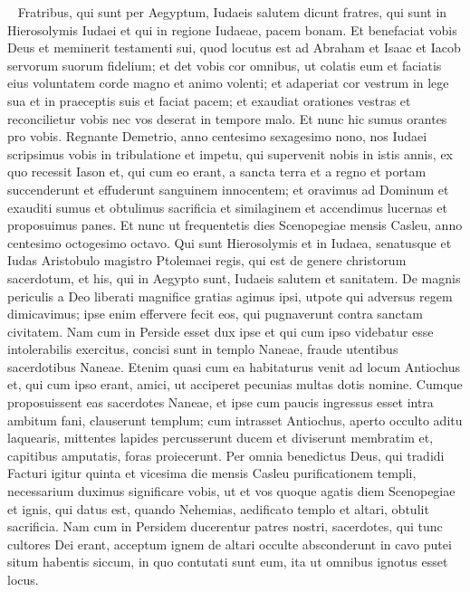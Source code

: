 
\begin{biblechapter}   
\verse Fratribus, qui sunt per Aegyptum, Iudaeis salutem dicunt fratres, qui sunt in Hierosolymis Iudaei et qui in regione Iudaeae, pacem bonam.  
\verse Et benefaciat vobis Deus et meminerit testamenti sui, quod locutus est ad Abraham et Isaac et Iacob servorum suorum fidelium; 
\verse et det vobis cor omnibus, ut colatis eum et faciatis eius voluntatem corde magno et animo volenti; 
\verse et adaperiat cor vestrum in lege sua et in praeceptis suis et faciat pacem; 
\verse et exaudiat orationes vestras et reconcilietur vobis nec vos deserat in tempore malo. 
\verse Et nunc hic sumus orantes pro vobis. 
\verse Regnante Demetrio, anno centesimo sexagesimo nono, nos Iudaei scripsimus vobis in tribulatione et impetu, qui supervenit nobis in istis annis, ex quo recessit Iason et, qui cum eo erant, a sancta terra et a regno 
\verse et portam succenderunt et effuderunt sanguinem innocentem; et oravimus ad Dominum et exauditi sumus et obtulimus sacrificia et similaginem et accendimus lucernas et proposuimus panes. 
\verse Et nunc ut frequentetis dies Scenopegiae mensis Casleu,  
\verse anno centesimo octogesimo octavo. Qui sunt Hierosolymis et in Iudaea, senatusque et Iudas Aristobulo magistro Ptolemaei regis, qui est de genere christorum sacerdotum, et his, qui in Aegypto sunt, Iudaeis salutem et sanitatem. 
\verse De magnis periculis a Deo liberati magnifice gratias agimus ipsi, utpote qui adversus regem dimicavimus; 
\verse ipse enim effervere fecit eos, qui pugnaverunt contra sanctam civitatem. 
\verse Nam cum in Perside esset dux ipse et qui cum ipso videbatur esse intolerabilis exercitus, concisi sunt in templo Naneae, fraude utentibus sacerdotibus Naneae. 
\verse Etenim quasi cum ea habitaturus venit ad locum Antiochus et, qui cum ipso erant, amici, ut acciperet pecunias multas dotis nomine. 
\verse Cumque proposuissent eas sacerdotes Naneae, et ipse cum paucis ingressus esset intra ambitum fani, clauserunt templum; cum intrasset Antiochus, 
\verse aperto occulto aditu laquearis, mittentes lapides percusserunt ducem et diviserunt membratim et, capitibus amputatis, foras proiecerunt. 
\verse Per omnia benedictus Deus, qui tradidi 
\verse Facturi igitur quinta et vicesima die mensis Casleu purificationem templi, necessarium duximus significare vobis, ut et vos quoque agatis diem Scenopegiae et ignis, qui datus est, quando Nehemias, aedificato templo et altari, obtulit sacrificia. 
\verse Nam cum in Persidem ducerentur patres nostri, sacerdotes, qui tunc cultores Dei erant, acceptum ignem de altari occulte absconderunt in cavo putei situm habentis siccum, in quo contutati sunt eum, ita ut omnibus ignotus esset locus. 

\end{biblechapter}
